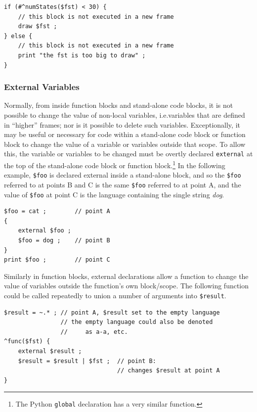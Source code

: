 \documentclass[letterpaper,12pt]{article}
\begin{document}
\begin{Verbatim}[fontsize=\small]
if (#^numStates($fst) < 30) {
    // this block is not executed in a new frame
    draw $fst ;
} else {
    // this block is not executed in a new frame
    print "the fst is too big to draw" ;
}
\end{Verbatim}


\subsubsection{External Variables}

Normally, from inside function blocks and stand-alone code blocks,
it is not possible to change the value of non-local variables,
i.e.\@ variables that are defined in ``higher'' frames; nor is it
possible to delete such variables.  Exceptionally, it may be useful
or necessary for code within a stand-alone code block or function
block to change the value of a variable or variables outside that
scope.  To allow this, the variable or variables to be changed must
be overtly declared \texttt{external} at the top of the stand-alone
code block or function block.\footnote{The Python \texttt{global}
declaration has a very similar function.}  In the following
example, \verb!$foo! is declared external inside a stand-alone
block, and so the \verb!$foo! referred to at points B and C is the
same \verb!$foo! referred to at point A, and the value of
\verb!$foo! at point C is the language containing the single string
\emph{dog}.

\begin{samepage}
\begin{Verbatim}[fontsize=\small]
$foo = cat ;        // point A
{
    external $foo ; 
    $foo = dog ;    // point B
}
print $foo ;        // point C
\end{Verbatim}
\end{samepage}

\noindent
Similarly in function blocks, external declarations allow a function to change the value
of variables outside the function's own block/scope.  The following function could be
called repeatedly to union a number of arguments into \verb!$result!.

\begin{samepage}
\begin{Verbatim}[fontsize=\small]
$result = ~.* ; // point A, $result set to the empty language
                // the empty language could also be denoted 
                //     as a-a, etc.
^func($fst) {
    external $result ;
    $result = $result | $fst ;  // point B: 
                                // changes $result at point A
}
\end{Verbatim}
\end{samepage}
\end{document}
